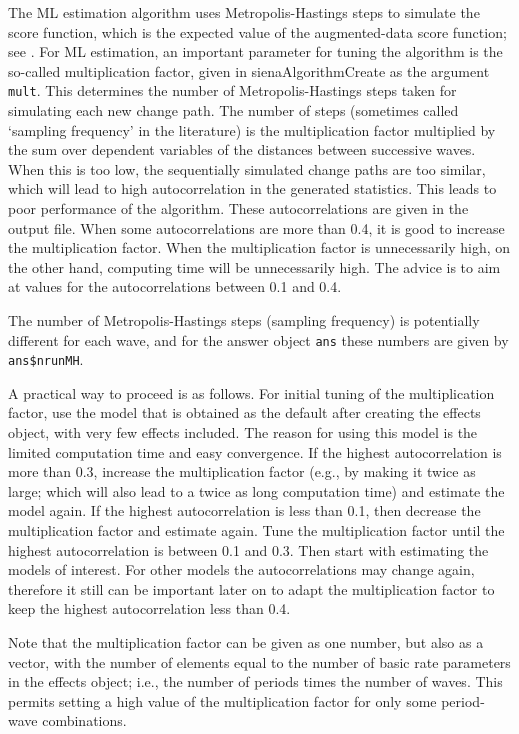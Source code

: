 \documentclass[a4paper,fleqn,11pt]{article}
\newcommand{\+}{\, + \,}
\newcommand{\sfn}[1]{\textsf{#1}}
\begin{document}
The ML estimation algorithm uses Metropolis-Hastings steps
to simulate the score function, which is the expected value
of the augmented-data score function;
see \citet{SnijdersEA10a}.
For ML estimation, an important parameter for tuning the
algorithm is the so-called \textsf{multiplication factor},
given in \sfn{sienaAlgorithmCreate} as the argument \texttt{mult}.
This determines the number of Metropolis-Hastings steps taken
for simulating each new change path.
The number of steps (sometimes called `sampling frequency' in the literature)
is the multiplication factor multiplied by the sum over dependent variables
of the distances between successive waves.
When this is too low, the
sequentially simulated change paths are too similar, which will
lead to high autocorrelation in the generated statistics.
This leads to poor performance of the algorithm.
These autocorrelations are given in the output file. When some
autocorrelations are more than 0.4, it is good to increase the
\textsf{multiplication factor}.
When the \textsf{multiplication factor} is unnecessarily high,
on the other hand, computing time will be unnecessarily high.
The advice is to aim at values for the autocorrelations
between 0.1 and 0.4.

The number of Metropolis-Hastings steps (sampling frequency)
is potentially different for each wave,
and for the answer object \texttt{ans} these numbers are
given by \texttt{ans\$nrunMH}.

A practical way to proceed is as follows.
For initial tuning of the multiplication factor, use the model that
is obtained as the default after creating the effects object,
with very few effects included. The reason for using this model
is the limited computation time and easy convergence.
If the highest autocorrelation is more than 0.3, increase the
multiplication factor (e.g., by making it twice as large;
which will also lead to a twice as long computation time)
and estimate the model again.
If the highest autocorrelation is less than 0.1, then decrease
the multiplication factor and estimate again.
Tune the multiplication factor until the highest autocorrelation
is between 0.1 and 0.3.
Then start with estimating the models of interest.
For other models the autocorrelations may change again, therefore
it still can be important later on to adapt the multiplication factor
to keep the highest autocorrelation less than 0.4.

Note that the multiplication factor can be given as one number,
but also as a vector, with the number of elements equal to the number of
basic rate parameters in the effects object; i.e., the number
of periods times the number of waves. This permits setting a high
value of the multiplication factor for only some period-wave combinations.
\end{document}
